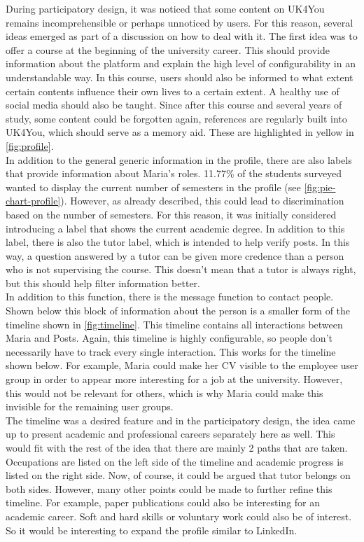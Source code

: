 During participatory design, it was noticed that some content on UK4You remains incomprehensible or perhaps unnoticed by users.
For this reason, several ideas emerged as part of a discussion on how to deal with it.
The first idea was to offer a course at the beginning of the university career.
This should provide information about the platform and explain the high level of configurability in an understandable way.
In this course, users should also be informed to what extent certain contents influence their own lives to a certain extent.
A healthy use of social media should also be taught.
Since after this course and several years of study, some content could be forgotten again, references are regularly built into UK4You, which should serve as a memory aid.
These are highlighted in yellow in \autoref{fig:profile}.\\

In addition to the general generic information in the profile, there are also labels that provide information about Maria's roles.
11.77\% of the students surveyed wanted to display the current number of semesters in the profile (see \autoref{fig:pie-chart-profile}).
However, as already described, this could lead to discrimination based on the number of semesters.
For this reason, it was initially considered introducing a label that shows the current academic degree.
In addition to this label, there is also the tutor label, which is intended to help verify posts.
In this way, a question answered by a tutor can be given more credence than a person who is not supervising the course.
This doesn't mean that a tutor is always right, but this should help filter information better.\\

In addition to this function, there is the message function to contact people.
Shown below this block of information about the person is a smaller form of the timeline shown in \autoref{fig:timeline}.
This timeline contains all interactions between Maria and Posts.
Again, this timeline is highly configurable, so people don't necessarily have to track every single interaction.
This works for the timeline shown below.
For example, Maria could make her CV visible to the employee user group in order to appear more interesting for a job at the university.
However, this would not be relevant for others, which is why Maria could make this invisible for the remaining user groups.\\

The timeline was a desired feature and in the participatory design, the idea came up to present academic and professional careers separately here as well.
This would fit with the rest of the idea that there are mainly 2 paths that are taken.
Occupations are listed on the left side of the timeline and academic progress is listed on the right side.
Now, of course, it could be argued that tutor belongs on both sides.
However, many other points could be made to further refine this timeline.
For example, paper publications could also be interesting for an academic career.
Soft and hard skills or voluntary work could also be of interest.
So it would be interesting to expand the profile similar to LinkedIn.\\

